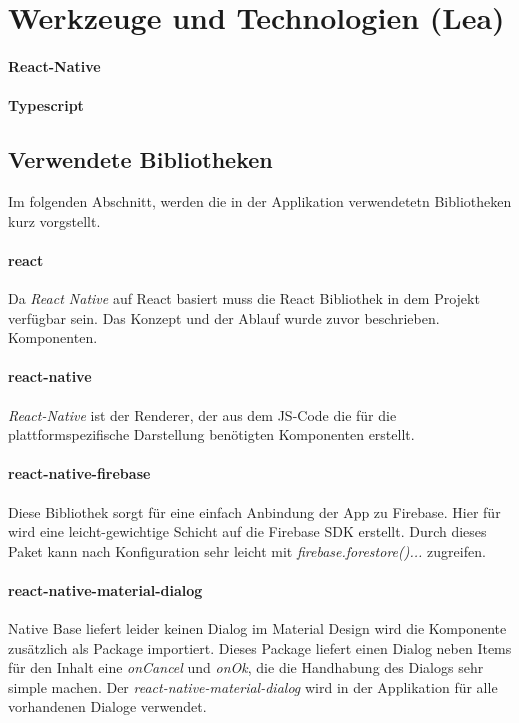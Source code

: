 \section{Werkzeuge und Technologien (Lea)}
\paragraph{React-Native}



\paragraph{Typescript}
\subsection{Verwendete Bibliotheken}
Im folgenden Abschnitt, werden die in der Applikation verwendetetn Bibliotheken kurz vorgstellt.


\paragraph{react}
Da \textit{React Native} auf React basiert muss die React Bibliothek
in dem Projekt verfügbar sein. Das Konzept und der Ablauf wurde zuvor beschrieben.
Komponenten. \cite{React:online}

\paragraph{react-native}
\textit{React-Native} ist der Renderer, der aus dem JS-Code
die für die plattformspezifische Darstellung benötigten Komponenten erstellt.
\cite{ReactNative:online}

\paragraph{react-native-firebase}
Diese Bibliothek sorgt für eine einfach Anbindung der App zu Firebase. Hier für wird eine leicht-gewichtige
Schicht auf die Firebase SDK erstellt. Durch dieses Paket kann nach Konfiguration sehr leicht mit \textit{firebase.forestore()...}
zugreifen.
\cite{invertas78:online}

\paragraph{react-native-material-dialog}
Native Base liefert leider keinen Dialog im Material Design wird die Komponente zusätzlich als Package
importiert. Dieses Package liefert einen Dialog neben Items für den Inhalt eine \textit{onCancel} und
\textit{onOk},  die die Handhabung des Dialogs sehr simple machen. Der \textit{react-native-material-dialog}
wird in der Applikation für alle vorhandenen Dialoge verwendet.
\cite{MaterialDialog:online}

